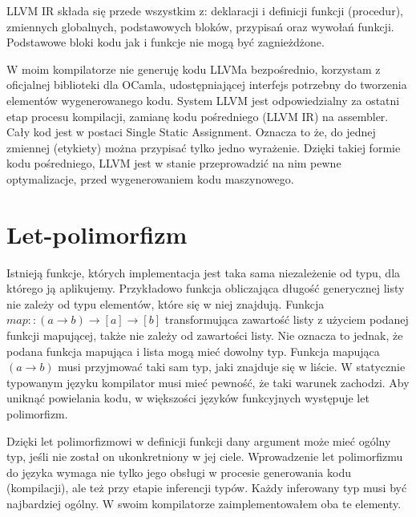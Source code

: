 \documentclass[declaration,shortabstract]{iithesis}
\begin{document}
LLVM IR składa się przede wszystkim z: deklaracji i definicji funkcji
(procedur), zmiennych globalnych, podstawowych bloków, przypisań oraz 
wywołań funkcji. Podstawowe bloki kodu jak i funkcje nie 
mogą być zagnieżdżone. 

W moim kompilatorze nie generuję kodu LLVMa bezpośrednio, 
korzystam z oficjalnej biblioteki dla OCamla, 
udostępniającej interfejs potrzebny do tworzenia elementów wygenerowanego kodu. 
System LLVM 
jest odpowiedzialny za ostatni etap procesu kompilacji, zamianę kodu 
pośredniego (LLVM IR) 
na assembler. Cały kod jest w postaci Single Static Assignment. Oznacza to że, 
do jednej zmiennej (etykiety) można przypisać tylko jedno wyrażenie. 
Dzięki takiej formie kodu pośredniego, LLVM jest w 
stanie przeprowadzić na nim pewne optymalizacje, przed wygenerowaniem kodu 
maszynowego. 



\section{Let-polimorfizm}

Istnieją funkcje, których implementacja jest taka sama niezależenie od typu, dla
którego ją aplikujemy. Przykładowo funkcja obliczająca długość generycznej
listy nie zależy od typu elementów, które się w niej znajdują. 
Funkcja $map :: (a \rightarrow b) \rightarrow [a] \rightarrow [b]$
transformująca zawartość listy 
z użyciem podanej funkcji mapującej, także nie zależy od zawartości listy. Nie 
oznacza to jednak, że podana funkcja mapująca i lista mogą mieć dowolny typ. 
Funkcja mapująca $(a \rightarrow b)$ musi przyjmować taki sam typ, jaki 
znajduje się w liście. W statycznie typowanym języku kompilator musi mieć 
pewność, że taki warunek zachodzi. Aby uniknąć powielania kodu, w większości 
języków funkcyjnych występuje let polimorfizm. 

Dzięki let polimorfizmowi w definicji funkcji dany argument może 
mieć ogólny typ, jeśli nie został on ukonkretniony w jej ciele.
Wprowadzenie let polimorfizmu do języka wymaga nie tylko jego obsługi 
w procesie generowania kodu (kompilacji), ale też przy etapie inferencji typów.
Każdy inferowany typ musi być najbardziej ogólny. W swoim kompilatorze 
zaimplementowałem oba te elementy. 
\end{document}
